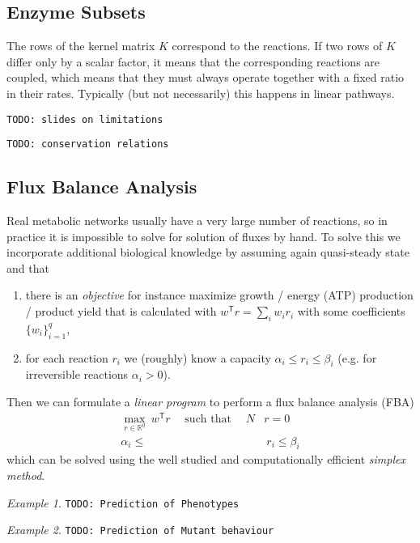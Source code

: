 \documentclass[a4paper]{article}
\newcommand{\todo}[1]{\texttt{TODO: #1}}
\newcommand{\T}{\mathsf{T}}
\DeclareMathOperator{\st}{such~that}
\theoremstyle{plain}
\theoremstyle{definition}
\theoremstyle{remark}
\newtheorem*{example}{Example}
\begin{document}
\subsection{Enzyme Subsets}

The rows of the kernel matrix $K$ correspond to the reactions. If two rows of
$K$ differ only by a scalar factor, it means that the corresponding reactions
are coupled, which means that they must always operate together with a fixed
ratio in their rates. Typically (but not necessarily) this happens in linear
pathways.

\todo{slides on limitations}

\todo{conservation relations}

\subsection{Flux Balance Analysis}

Real metabolic networks usually have a very large number of reactions, so in
practice it is impossible to solve for solution of fluxes by hand. To solve
this we incorporate additional biological knowledge by assuming again
quasi-steady state and that
\begin{enumerate}
  \item there is an \emph{objective} for instance maximize growth / energy
    (ATP) production / product yield that is calculated with $w^\T r = \sum_i
    w_i r_i$ with some coefficients $\{w_i\}_{i=1}^q$,
    
  \item for each reaction $r_i$ we (roughly) know a capacity $\alpha_i \leq
    r_i \leq \beta_i$ (e.g. for irreversible reactions $\alpha_i > 0$).
\end{enumerate}
Then we can formulate a \emph{linear program} to perform a flux balance
analysis (FBA)
\begin{align}
  \tag{FBA} \label{eqn:fba}
  \max_{r \in \mathbb{R}^q} ~ w^\T r \quad \st \quad N&r = 0 \\
       \alpha_i \leq &~r_i \leq \beta_i \nonumber
\end{align}
which can be solved using the well studied and computationally efficient
\emph{simplex method}.

\begin{example}
  \todo{Prediction of Phenotypes}
\end{example}

\begin{example}
  \todo{Prediction of Mutant behaviour}
\end{example}
\end{document}
